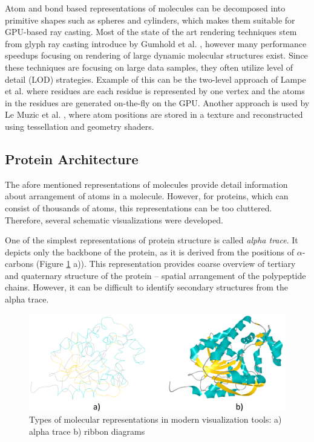 Atom and bond based representations of molecules can be decomposed into primitive shapes such as spheres and cylinders, which makes them suitable for GPU-based ray casting. Most of the state of the art rendering techniques stem from glyph ray casting introduce by Gumhold et al. \cite{gumhold2003splatting}, however many performance speedups focusing on rendering of large dynamic molecular structures exist. Since these techniques are focusing on large data samples, they often utilize level of detail (LOD) strategies. Example of this can be the two-level approach of Lampe et al. \cite{lampe2007two} where residues are each residue is represented by one vertex and the atoms in the residues are generated on-the-fly on the GPU. Another approach is used by Le Muzic et al. \cite{le2014illustrative}, where atom positions are stored in a texture and reconstructed using tessellation and geometry shaders.

\subsection{Protein Architecture}
The afore mentioned representations of molecules provide detail information about arrangement of atoms in a molecule. However, for proteins, which can consist of thousands of atoms, this representations can be too cluttered. Therefore, several schematic visualizations were developed.

One of the simplest representations of protein structure is called \textit{alpha trace}. It depicts only the backbone of the protein, as it is derived from the positions of $\alpha$-carbons (Figure \ref{Fig:vis2} a)). This representation provides coarse overview of tertiary and quaternary structure of the protein -- spatial arrangement of the polypeptide chains. However, it can be difficult to identify secondary structures from the alpha trace.

\begin{figure}[H]
  \centering
  \includegraphics[width=\linewidth]{pictures/representations.pdf} 
  \caption{Types of molecular representations in modern visualization tools: a) alpha trace b) ribbon diagrams}
  \label{Fig:vis2}  
\end{figure} 

